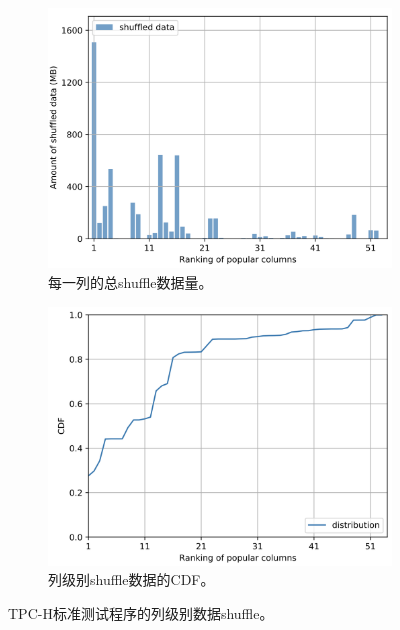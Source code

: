 \begin{figure}[]
	\centering
	\begin{subfigure}[t]{0.5\textwidth}
		\centering
		\includegraphics[width=1\textwidth]{img/motivation/pop-shf-a}
		\caption{每一列的总shuffle数据量。}
		\label{fig:pop-shf-a}
	\end{subfigure}%
	
	\begin{subfigure}[t]{0.5\textwidth}
		\centering
		\includegraphics[width=1\textwidth]{img/motivation/pop-shf-b}
		\caption{列级别shuffle数据的CDF。}
		\label{fig:pop-shf-b}
	\end{subfigure}%
	
	\caption{TPC-H标准测试程序的列级别数据shuffle。}
	\label{fig:pop-shf}
\end{figure}

